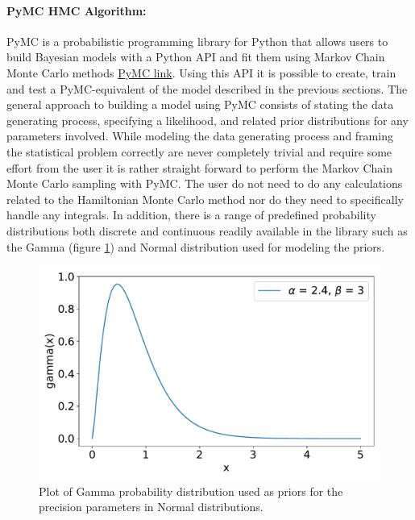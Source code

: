 \begin{example}
	\paragraph{PyMC HMC Algorithm:} PyMC is a probabilistic programming library for Python that allows users to build Bayesian models with a Python API and fit them using Markov Chain Monte Carlo methods \href{https://www.pymc.io/welcome.html}{PyMC link}. Using this API it is possible to create, train and test a PyMC-equivalent of the model described in the previous sections. The general approach to building a model using PyMC consists of stating the data generating process, specifying a likelihood, and related prior distributions for any parameters involved. While modeling the data generating process and framing the statistical problem correctly are never completely trivial and require some effort from the user it is rather straight forward to perform the Markov Chain Monte Carlo sampling with PyMC. The user do not need to do any calculations related to the Hamiltonian Monte Carlo method nor do they need to specifically handle any integrals. In addition, there is a range of predefined probability distributions both discrete and continuous readily available in the library such as the Gamma (figure \ref{fig:gamma}) and Normal distribution used for modeling the priors.
	\begin{figure}[H]
		\centering
		\includegraphics[width = 1\textwidth]{figures/gamma_dist.pdf}
		\caption{Plot of Gamma probability distribution used as priors for the precision parameters in Normal distributions.}
		\label{fig:gamma}
	\end{figure}

\end{example}
